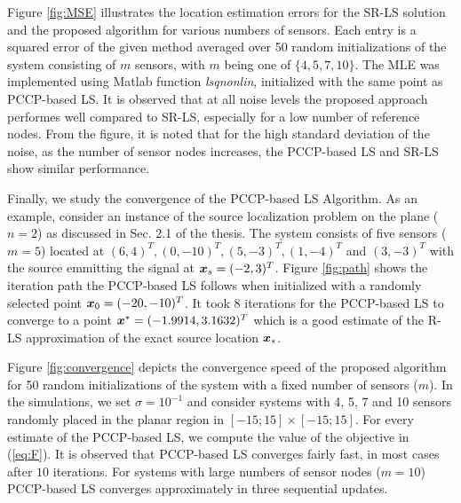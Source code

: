 Figure \ref{fig:MSE} illustrates the  location estimation errors for the SR-LS solution and the proposed algorithm for various numbers of sensors. Each entry is a squared error of the given method averaged over 50 random initializations of the system  consisting of $m$ sensors, with $m$ being one of $\{4, 5, 7, 10\}$. The MLE was implemented using Matlab function \textit{lsqnonlin}, initialized with the same point as PCCP-based LS. It is observed that at all noise levels the proposed approach performes well compared to SR-LS, especially for a low number of reference nodes. From the figure, it is noted that for the high standard deviation of the noise, as the number of sensor nodes increases, the PCCP-based LS and SR-LS show similar performance.

 
Finally, we study the convergence of the  PCCP-based LS Algorithm. As an example, consider an instance of the source localization problem on the plane ($n = 2$) as discussed in Sec. 2.1 of the thesis. The system consists of five sensors ($m = 5$) located at $(6,4)^T, (0,-10)^T, (5,-3)^T, (1,-4)^T$ and  $(3,-3)^T$ with the source emmitting the signal at $\mbox{\boldmath$x$}_s = (-2,3)^T$. Figure \ref{fig:path} shows the iteration path the PCCP-based LS follows when initialized with a randomly selected point $\mbox{\boldmath$x$}_0 = (-20,-10)^T$. It took 8 iterations for the PCCP-based LS to converge to a point $\mbox{\boldmath$x$}^* = (-1.9914,3.1632)^T$ which is a good estimate of the R-LS approximation of the exact source location $\mbox{\boldmath$x$}_s$.


Figure  \ref{fig:convergence} depicts the convergence speed of the proposed algorithm for 50 random initializations of the system with a fixed number of sensors ($m$). In the simulations, we set $\sigma = 10^{-1}$ and consider systems with 4, 5, 7 and 10 sensors randomly placed in the planar region in $[-15;15]\times[-15;15]$. For every estimate of the PCCP-based LS, we compute the value of the objective in (\ref{eq:F}). It is observed that PCCP-based LS converges fairly fast, in most cases after $10$ iterations. For systems with large numbers of sensor nodes ($m = 10$) PCCP-based LS converges approximately
in three sequential updates.

